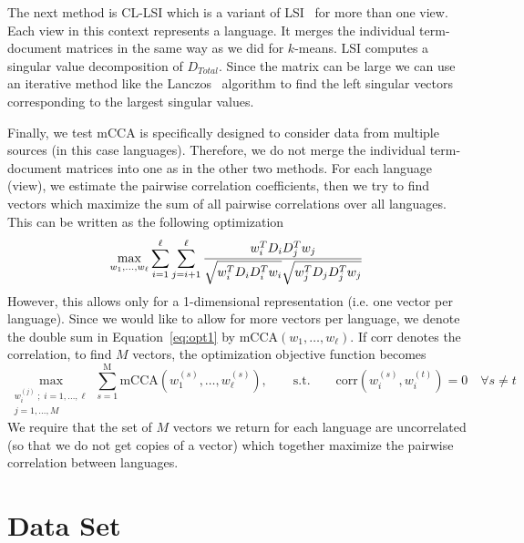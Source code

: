 \documentclass{article} %
\begin{document}
The next method is CL-LSI which is a variant of LSI~\cite{lsi}
for more than one view. Each view in this context represents a
language. It merges the individual term-document matrices in the
same way as we did for $k$-means.  LSI computes a singular value
decomposition of $D_{Total}$. Since the matrix can be large we
can use an iterative method like the Lanczos~\cite{matrix_comp}
algorithm to find the left singular vectors corresponding to the
largest singular values.

Finally, we test mCCA is specifically designed to consider data
from multiple sources (in this case languages). Therefore, we do
not merge the individual term-document matrices into one as in
the other two methods. For each language (view), we estimate the
pairwise correlation coefficients, then we try to find vectors
which maximize the sum of all pairwise correlations over all
languages. This can be written as the following optimization
\begin{equation}
\label{eq:opt1}
\max_{w_1,\ldots, w_\ell} \sum_{i=1}^\ell\sum_{j=i+1}^\ell  \frac{w_i^T D_i D_j^T w_j}{\sqrt{ w_i^T D_i D_i^T w_i\vphantom{ D_j^T } }\sqrt{ w_j^T D_j D_j^T w_j}}
\end{equation}
However, this allows only for a 1-dimensional representation
(i.e. one vector per language). Since we would like to allow for
more vectors per language, we denote the double sum in
Equation~\ref{eq:opt1} by $\mbox{mCCA}(w_1,\ldots,w_\ell)$. If
$\mbox{corr}$ denotes the correlation, to find $M$ vectors, the
optimization objective function  becomes
\begin{equation}
\max_{\substack{w_i^{(j)}\;;\;i=1,\ldots,\ell\\j=1,\ldots,M }}\sum_{s=1}^{\mbox{M}} \mbox{mCCA}\left(w_1^{(s)},\ldots,w_\ell^{(s)}\right),
\qquad\mbox{s.t.} \qquad \mbox{corr} \left(w_i^{(s)},w_i^{(t)}\right) = 0
\quad \forall s\neq t
\end{equation}
We require that the set of $M$ vectors we return for each
language are uncorrelated (so that we do not get copies
of a vector) which together maximize the pairwise correlation
between languages.


\section{Data Set}
\end{document}
